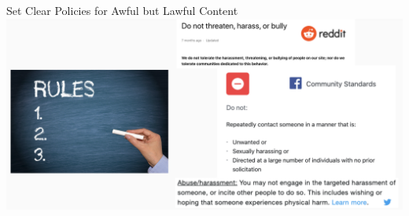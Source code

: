 \documentclass[nobackground,dvipsnames,table,aspectratio=169]{beamer}
\begin{document}
\begin{frame}{Set Clear Policies for Awful but Lawful Content}
    \includegraphics[width=\textwidth]{content-policies}
\end{frame}
\end{document}
